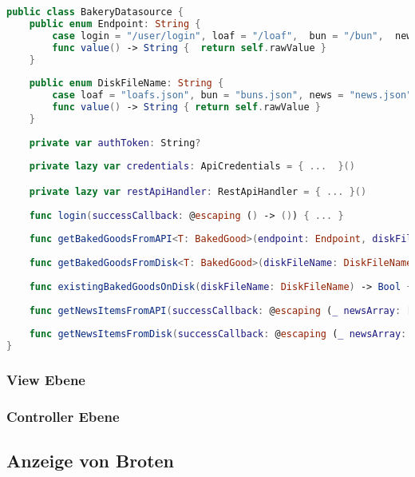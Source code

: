 \begin{lstlisting}[language=Swift]
public class BakeryDatasource {
    public enum Endpoint: String {
        case login = "/user/login", loaf = "/loaf",  bun = "/bun",  news = "/news", picture = "/picture"
        func value() -> String {  return self.rawValue }
    }
    
    public enum DiskFileName: String {
        case loaf = "loafs.json", bun = "buns.json", news = "news.json"
        func value() -> String { return self.rawValue }
    }
    
    private var authToken: String?
    
    private lazy var credentials: ApiCredentials = { ...  }()

    private lazy var restApiHandler: RestApiHandler = { ... }()
    
    func login(successCallback: @escaping () -> ()) { ... }
    
    func getBakedGoodsFromAPI<T: BakedGood>(endpoint: Endpoint, diskFileName: DiskFileName, successCallback: @escaping (_ loafArray: [T], _ imageDataArray: [Data])->()) { ... }
    
    func getBakedGoodsFromDisk<T: BakedGood>(diskFileName: DiskFileName, successCallback: @escaping (_ loafArray: [T], _ imageDataArray: [Data])->()) { ... }
    
    func existingBakedGoodsOnDisk(diskFileName: DiskFileName) -> Bool { ... }
    
    func getNewsItemsFromAPI(successCallback: @escaping (_ newsArray: [NewsItem], _ imageDataArray: [Data])->()) { ... }
    
    func getNewsItemsFromDisk(successCallback: @escaping (_ newsArray: [NewsItem], _ imageDataArray: [Data])->()) { ... }
}

\end{lstlisting}

\clearpage

\subsubsection{View Ebene}

\clearpage

\subsubsection{Controller Ebene}

\clearpage

\subsection{Anzeige von Broten}

